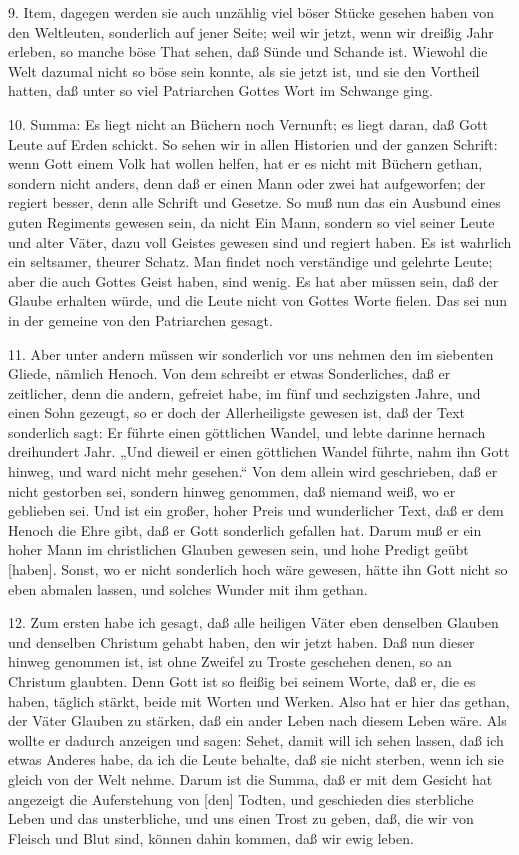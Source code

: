 9. Item, dagegen werden sie auch unzählig viel böser Stücke gesehen haben von den Weltleuten, sonderlich auf jener Seite; weil wir jetzt, wenn wir dreißig Jahr erleben, so manche böse That sehen, daß Sünde und Schande ist. Wiewohl die Welt dazumal nicht so böse sein konnte, als sie jetzt ist, und sie den Vortheil hatten, daß unter so viel Patriarchen Gottes Wort im Schwange ging.

10. Summa: Es liegt nicht an Büchern noch Vernunft; es liegt daran, daß Gott Leute auf Erden schickt. So sehen wir in allen Historien und der ganzen Schrift: wenn Gott einem Volk hat wollen helfen, hat er es nicht mit Büchern gethan, sondern nicht anders, denn daß er einen Mann oder zwei hat aufgeworfen; der regiert besser, denn alle Schrift und Gesetze. So muß nun das ein Ausbund eines guten Regiments gewesen sein, da nicht Ein Mann, sondern so viel seiner Leute und alter Väter, dazu voll Geistes gewesen sind und regiert haben. Es ist wahrlich ein seltsamer, theurer Schatz. Man findet noch verständige und gelehrte Leute; aber die auch Gottes Geist haben, sind wenig. Es hat aber müssen sein, daß der Glaube erhalten würde, und die Leute nicht von Gottes Worte fielen. Das sei nun in der gemeine von den Patriarchen gesagt.

11. Aber unter andern müssen wir sonderlich vor uns nehmen den im siebenten Gliede, nämlich Henoch. Von dem schreibt er etwas Sonderliches, daß er zeitlicher, denn die andern, gefreiet habe, im fünf und sechzigsten Jahre, und einen Sohn gezeugt, so er doch der Allerheiligste gewesen ist, daß der Text sonderlich sagt: Er führte einen göttlichen Wandel, und lebte darinne hernach dreihundert Jahr. „Und dieweil er einen göttlichen Wandel führte, nahm ihn Gott hinweg, und ward nicht mehr gesehen.“ Von dem allein wird geschrieben, daß er nicht gestorben sei, sondern hinweg genommen, daß niemand weiß, wo er geblieben sei. Und ist ein großer, hoher Preis und wunderlicher Text, daß er dem Henoch die Ehre gibt, daß er Gott sonderlich gefallen hat. Darum muß er ein hoher Mann im christlichen Glauben gewesen sein, und hohe Predigt geübt [haben]. Sonst, wo er nicht sonderlich hoch wäre gewesen, hätte ihn Gott nicht so eben abmalen lassen, und solches Wunder mit ihm gethan.

12. Zum ersten habe ich gesagt, daß alle heiligen Väter eben denselben Glauben und denselben Christum gehabt haben, den wir jetzt haben. Daß nun dieser hinweg genommen ist, ist ohne Zweifel zu Troste geschehen denen, so an Christum glaubten. Denn Gott ist so fleißig bei seinem Worte, daß er, die es haben, täglich stärkt, beide mit Worten und Werken. Also hat er hier das gethan, der Väter Glauben zu stärken, daß ein ander Leben nach diesem Leben wäre. Als wollte er dadurch anzeigen und sagen: Sehet, damit will ich sehen lassen, daß ich etwas Anderes habe, da ich die Leute behalte, daß sie nicht sterben, wenn ich sie gleich von der Welt nehme. Darum ist die Summa, daß er mit dem Gesicht hat angezeigt die Auferstehung von [den] Todten, und geschieden dies sterbliche Leben und das unsterbliche, und uns einen Trost zu geben, daß, die wir von Fleisch und Blut sind, können dahin kommen, daß wir ewig leben.

